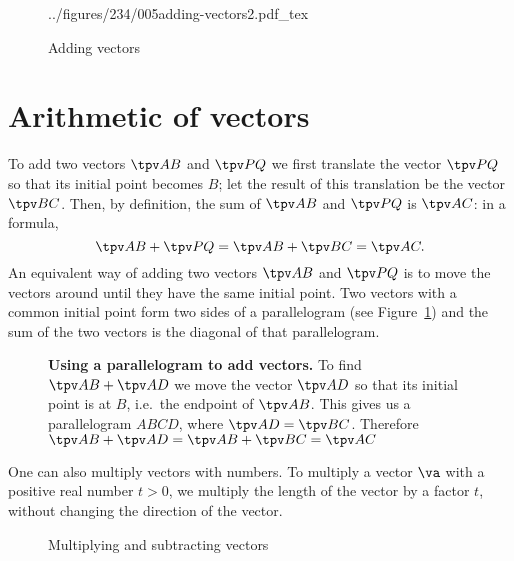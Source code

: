 \begin{figure}[h]\centering
  \def\figfont{\sffamily\footnotesize\color{darkbluegreen}\centering}
  \def\addingvectorsCapA{\parbox{1in}{\figfont%
      to add\\
      two vectors\dots}} \def\addingvectorsCapB{\parbox{1in}{\figfont%
      \dots move one vector until its initial point\dots}}
  \def\addingvectorsCapC{\parbox{1in}{\figfont%
      \dots is the end point of the other\dots} }
  \def\addingvectorsCapD{\parbox{1in}{\figfont%
      \dots and combine them.} } 
  ../figures/234/005adding-vectors2.pdf_tex
  \caption{Adding vectors}
\end{figure}
\section{Arithmetic of vectors} %
\label{sec:arithmetic-of-vectors}
To add two vectors $\tpv AB$ and $\tpv PQ$ we first translate the
vector $\tpv PQ$ so that its initial point becomes $B$; let the result
of this translation be the vector $\tpv BC$.  Then, by definition, the
sum of $\tpv AB$ and $\tpv PQ$ is $\tpv AC$: in a formula,
\[
\tpv AB + \tpv PQ = \tpv AB + \tpv BC = \tpv AC.
\]
An equivalent way of adding two vectors $\tpv AB$ and $\tpv PQ$ is to
move the vectors around until they have the same initial point.  Two
vectors with a common initial point form two sides of a parallelogram
(see Figure~\ref{fig:adding-vectors-parallelogram}) and the sum of the
two vectors is the diagonal of that parallelogram.
\begin{figure}[h]
  
  \caption{{\bfseries Using a parallelogram to add vectors. } To find
    $\tpv AB + \tpv AD$ we move the vector $\tpv AD$ so that its
    initial point is at $B$, i.e.~the endpoint of $\tpv AB$.  This
    gives us a parallelogram $ABCD$, where $\tpv AD = \tpv BC$.
    Therefore $\tpv AB+\tpv AD = \tpv AB+\tpv BC = \tpv AC$ }
  \label{fig:adding-vectors-parallelogram}
\end{figure}

One can also multiply vectors with numbers.  To multiply a vector
$\va$ with a positive real number $t>0$, we multiply the length of the
vector by a factor $t$, without changing the direction of the vector.
\begin{figure}[h]
  
  \caption{Multiplying and subtracting vectors}
\end{figure}
